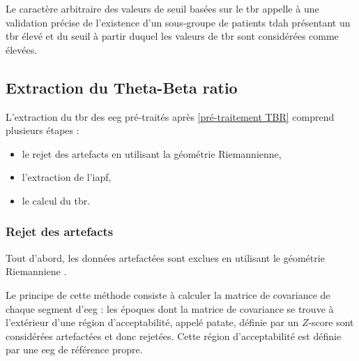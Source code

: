Le caractère arbitraire des valeurs de seuil basées sur le \gls{tbr} appelle à une validation précise de l'existence d'un 
sous-groupe de patients \gls{tdah} présentant un \gls{tbr} élevé et du seuil à partir duquel les valeurs de \gls{tbr} sont considérées comme élevées.  
 
\subsection{Extraction du Theta-Beta ratio} \label{extraction_tbr}
L'extraction du \gls{tbr} des \gls{eeg} pré-traités après \ref{pré-traitement TBR} comprend plusieurs étapes :
\begin{itemize}
\item le rejet des artefacts en utilisant la géométrie Riemannienne,
\item l'extraction de l'\gls{iapf},
\item le calcul du \gls{tbr}.
\end{itemize}

\subsubsection{Rejet des artefacts}
Tout d'abord, les données artefactées sont exclues en utilisant le géométrie Riemanniene \citep{Barachant2013, Barthelemy2019}. 

Le principe de cette méthode consiste à calculer la matrice de covariance de chaque segment d'\gls{eeg} : les époques dont la matrice de covariance se trouve à l'extérieur d'une région
d'acceptabilité, appelé patate, définie par un $Z$-score sont considérées artefactées et donc rejetées. Cette région d'acceptabilité est définie par une \gls{eeg} de référence propre.

